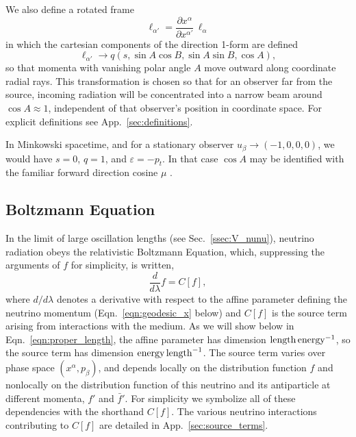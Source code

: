 \documentclass[aps,floatfix,prd,superscriptaddress,twocolumn]{revtex4-1}
\begin{document}
We also define a rotated frame
\begin{equation}
  \ell_{\alpha'}=\frac{\partial x^\alpha}{\partial x^{\alpha'}}\,\ell_\alpha \nonumber
\end{equation}
in which the cartesian components of the direction 1-form are defined
\begin{equation}
  \label{eqn:def_direction_primed}
  \ell_{\alpha'} \rightarrow
  q (s,\sin A \cos B,\sin A\sin B,\cos A),
\end{equation}
so that momenta with vanishing polar angle $A$ move outward along coordinate
radial rays.
This transformation is chosen so that for an observer far from the source,
incoming radiation will be concentrated into a narrow beam around $\cos A\approx1$,
independent of that observer's position in coordinate space.
For explicit definitions see App.~\ref{sec:definitions}.

In Minkowski spacetime, and for a stationary observer
$u_\beta\rightarrow(-1,0,0,0)$, we would have $s=0$, $q=1$,
and $\varepsilon=-p_t$. In that case $\cos A$ may be identified
with the familiar forward direction cosine $\mu$
\citep{shu1991-book_radiation,miha1999-foundations}.

\subsection{Boltzmann Equation}
\label{ssec:boltzmann}
In the limit of large oscillation lengths (see Sec.~\ref{ssec:V_nunu}),
neutrino radiation obeys the relativistic Boltzmann Equation,
which, suppressing the arguments of $f$ for simplicity, is written,
\begin{equation}
  \label{eqn:boltzmann}
  \frac{d}{d\lambda}f = C[f],
\end{equation}
where $d/d\lambda$ denotes a derivative with respect to the affine
parameter defining the neutrino momentum (Eqn.~\ref{eqn:geodesic_x} below)
and $C[f]$ is the source term arising from interactions with the medium.
As we will show below in Eqn.~\ref{eqn:proper_length},
the affine parameter has dimension ${\rm length}\,{\rm energy}^{-1}$,
so the source term has dimension ${\rm energy}\,{\rm length}^{-1}$.
The source term varies over phase space $(x^\alpha,p_\beta)$,
and depends locally on the distribution function $f$
and nonlocally on the distribution function of this neutrino and its
antiparticle at different momenta, $f'$ and $\bar{f}'$.
For simplicity we symbolize all of these dependencies with the shorthand $C[f]$.
The various neutrino interactions contributing to $C[f]$ are detailed in
App.~\ref{sec:source_terms}.
\end{document}
